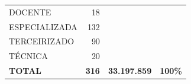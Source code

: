 \documentclass{article}
\begin{document}
\begin{longtable}[c]{m{7cm}|m{2.5cm}|m{2.5cm}|m{2.5cm}}
\multicolumn{1}{L{7cm}|}{ \hspace{3em} DOCENTE} & \multicolumn{1}{r|}{ 18} &  & \\
\multicolumn{1}{L{7cm}|}{ \hspace{3em} ESPECIALIZADA} & \multicolumn{1}{r|}{ 132} &  & \\
\multicolumn{1}{L{7cm}|}{ \hspace{3em} TERCEIRIZADO} & \multicolumn{1}{r|}{ 90} &  & \\
\multicolumn{1}{L{7cm}|}{ \hspace{3em} TÉCNICA} & \multicolumn{1}{r|}{ 20} &  & \\
\hline \hline 
\multicolumn{1}{L{7cm}|}{ \textbf{TOTAL}} & \multicolumn{1}{r|}{ \textbf{316}} & \multicolumn{1}{r|}{ \textbf{33.197.859}} & \multicolumn{1}{r}{ \textbf{100\%}} \\
\end{longtable}
\newpage
\small
\end{document}
